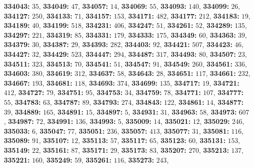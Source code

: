 \textsf{\bfseries 334043:} $35$, \textsf{\bfseries 334049:} $47$, \textsf{\bfseries 334057:} $14$, \textsf{\bfseries 334069:} $55$, \textsf{\bfseries 334093:} $140$, \textsf{\bfseries 334099:} $26$, \textsf{\bfseries 334127:} $250$, \textsf{\bfseries 334133:} $71$, \textsf{\bfseries 334157:} $153$, \textsf{\bfseries 334171:} $482$, \textsf{\bfseries 334177:} $212$, \textsf{\bfseries 334183:} $19$, \textsf{\bfseries 334189:} $40$, \textsf{\bfseries 334199:} $518$, \textsf{\bfseries 334231:} $406$, \textsf{\bfseries 334247:} $51$, \textsf{\bfseries 334261:} $52$, \textsf{\bfseries 334289:} $135$, \textsf{\bfseries 334297:} $221$, \textsf{\bfseries 334319:} $85$, \textsf{\bfseries 334331:} $179$, \textsf{\bfseries 334333:} $175$, \textsf{\bfseries 334349:} $60$, \textsf{\bfseries 334363:} $39$, \textsf{\bfseries 334379:} $30$, \textsf{\bfseries 334387:} $29$, \textsf{\bfseries 334393:} $282$, \textsf{\bfseries 334403:} $92$, \textsf{\bfseries 334421:} $507$, \textsf{\bfseries 334423:} $46$, \textsf{\bfseries 334427:} $32$, \textsf{\bfseries 334429:} $523$, \textsf{\bfseries 334447:} $294$, \textsf{\bfseries 334487:} $317$, \textsf{\bfseries 334493:} $80$, \textsf{\bfseries 334507:} $23$, \textsf{\bfseries 334511:} $323$, \textsf{\bfseries 334513:} $70$, \textsf{\bfseries 334541:} $51$, \textsf{\bfseries 334547:} $91$, \textsf{\bfseries 334549:} $260$, \textsf{\bfseries 334561:} $336$, \textsf{\bfseries 334603:} $380$, \textsf{\bfseries 334619:} $312$, \textsf{\bfseries 334637:} $58$, \textsf{\bfseries 334643:} $28$, \textsf{\bfseries 334651:} $117$, \textsf{\bfseries 334661:} $232$, \textsf{\bfseries 334667:} $193$, \textsf{\bfseries 334681:} $118$, \textsf{\bfseries 334693:} $374$, \textsf{\bfseries 334699:} $135$, \textsf{\bfseries 334717:} $19$, \textsf{\bfseries 334721:} $412$, \textsf{\bfseries 334727:} $79$, \textsf{\bfseries 334751:} $95$, \textsf{\bfseries 334753:} $34$, \textsf{\bfseries 334759:} $78$, \textsf{\bfseries 334771:} $107$, \textsf{\bfseries 334777:} $55$, \textsf{\bfseries 334783:} $63$, \textsf{\bfseries 334787:} $89$, \textsf{\bfseries 334793:} $274$, \textsf{\bfseries 334843:} $122$, \textsf{\bfseries 334861:} $14$, \textsf{\bfseries 334877:} $39$, \textsf{\bfseries 334889:} $165$, \textsf{\bfseries 334891:} $15$, \textsf{\bfseries 334897:} $5$, \textsf{\bfseries 334931:} $31$, \textsf{\bfseries 334963:} $58$, \textsf{\bfseries 334973:} $607$, \textsf{\bfseries 334987:} $72$, \textsf{\bfseries 334991:} $136$, \textsf{\bfseries 334993:} $5$, \textsf{\bfseries 335009:} $14$, \textsf{\bfseries 335021:} $12$, \textsf{\bfseries 335029:} $246$, \textsf{\bfseries 335033:} $6$, \textsf{\bfseries 335047:} $77$, \textsf{\bfseries 335051:} $236$, \textsf{\bfseries 335057:} $413$, \textsf{\bfseries 335077:} $31$, \textsf{\bfseries 335081:} $116$, \textsf{\bfseries 335089:} $91$, \textsf{\bfseries 335107:} $12$, \textsf{\bfseries 335113:} $57$, \textsf{\bfseries 335117:} $65$, \textsf{\bfseries 335123:} $60$, \textsf{\bfseries 335131:} $153$, \textsf{\bfseries 335149:} $22$, \textsf{\bfseries 335161:} $87$, \textsf{\bfseries 335171:} $29$, \textsf{\bfseries 335173:} $83$, \textsf{\bfseries 335207:} $270$, \textsf{\bfseries 335213:} $137$, \textsf{\bfseries 335221:} $160$, \textsf{\bfseries 335249:} $59$, \textsf{\bfseries 335261:} $116$, \textsf{\bfseries 335273:} $243$, 
